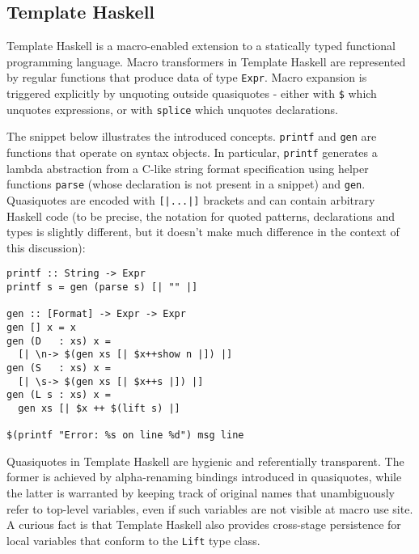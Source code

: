\documentclass[10pt,journal,a4paper]{IEEEtran}
\begin{document}
\subsection{Template Haskell}

Template Haskell is a macro-enabled extension to a statically typed functional programming language.
Macro transformers in Template Haskell are represented by regular functions that produce
data of type \small \texttt{Expr}\normalsize. Macro expansion is triggered explicitly by
unquoting outside quasiquotes - either with \small \texttt{\$} \normalsize which unquotes expressions,
or with \small \texttt{splice} \normalsize which unquotes declarations.

The snippet below illustrates the introduced concepts. \small \texttt{printf} \normalsize and
\small \texttt{gen} \normalsize are functions that operate on syntax objects. In particular,
\small \texttt{printf} \normalsize generates a lambda abstraction from a C-like string format
specification using helper functions \small \texttt{parse} \normalsize (whose declaration is
not present in a snippet) and \small \texttt{gen}\normalsize.
Quasiquotes are encoded with \small \texttt{[|...|]} \normalsize brackets and can contain arbitrary
Haskell code (to be precise, the notation for quoted patterns, declarations and types is slightly different,
but it doesn't make much difference in the context of this discussion):

\small
\begin{verbatim}
printf :: String -> Expr
printf s = gen (parse s) [| "" |]

gen :: [Format] -> Expr -> Expr
gen [] x = x
gen (D   : xs) x =
  [| \n-> $(gen xs [| $x++show n |]) |]
gen (S   : xs) x =
  [| \s-> $(gen xs [| $x++s |]) |]
gen (L s : xs) x =
  gen xs [| $x ++ $(lift s) |]

$(printf "Error: %s on line %d") msg line
\end{verbatim}
\normalsize

Quasiquotes in Template Haskell are hygienic and referentially transparent. The former is achieved
by alpha-renaming bindings introduced in quasiquotes, while the latter is warranted by keeping track
of original names that unambiguously refer to top-level variables, even if such variables are not visible
at macro use site. A curious fact is that Template Haskell also provides cross-stage persistence for
local variables that conform to the \small \texttt{Lift} \normalsize type class.
\end{document}

